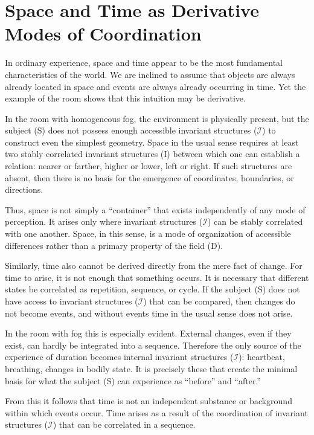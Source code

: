 \documentclass[aps,prd,onecolumn,nofootinbib,superscriptaddress]{revtex4-2}
\begin{document}
\section{Space and Time as Derivative Modes of Coordination}
In ordinary experience, space and time appear to be the most fundamental characteristics of the world. We are inclined to assume that objects are always already located in space and events are always already occurring in time. Yet the example of the room shows that this intuition may be derivative.

In the room with homogeneous fog, the environment is physically present, but the subject (S) does not possess enough accessible invariant structures ($\mathcal{I}$) to construct even the simplest geometry. Space in the usual sense requires at least two stably correlated invariant structures (I) between which one can establish a relation: nearer or farther, higher or lower, left or right. If such structures are absent, then there is no basis for the emergence of coordinates, boundaries, or directions.

Thus, space is not simply a “container” that exists independently of any mode of perception. It arises only where invariant structures ($\mathcal{I}$) can be stably correlated with one another. Space, in this sense, is a mode of organization of accessible differences rather than a primary property of the field (D).

Similarly, time also cannot be derived directly from the mere fact of change. For time to arise, it is not enough that something occurs. It is necessary that different states be correlated as repetition, sequence, or cycle. If the subject (S) does not have access to invariant structures ($\mathcal{I}$) that can be compared, then changes do not become events, and without events time in the usual sense does not arise.

In the room with fog this is especially evident. External changes, even if they exist, can hardly be integrated into a sequence. Therefore the only source of the experience of duration becomes internal invariant structures ($\mathcal{I}$): heartbeat, breathing, changes in bodily state. It is precisely these that create the minimal basis for what the subject (S) can experience as “before” and “after.”

From this it follows that time is not an independent substance or background within which events occur. Time arises as a result of the coordination of invariant structures ($\mathcal{I}$) that can be correlated in a sequence.
\end{document}

